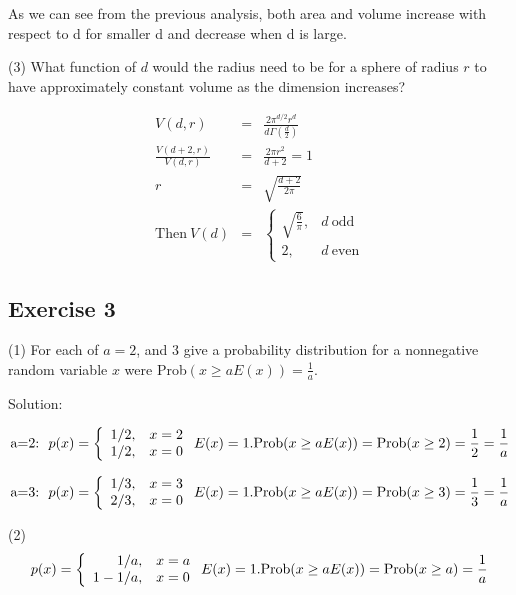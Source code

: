 \begin{sloppypar}
As we can see from the previous analysis, both area and volume increase with respect to d for smaller d and decrease when d is large.

(3) What function of $d$ would the radius need to be for a sphere of radius $r$ to have approximately constant volume as the dimension increases?\par
\begin{eqnarray*}
    V(d,r)&=&\frac{2\pi^{d/2}r^d}{d\Gamma(\frac{d}{2})}\\
    \frac{V(d+2,r)}{V(d,r)}&=&\frac{2\pi r^2}{d+2}=1\\
    r&=&\sqrt{\frac{d+2}{2\pi}}\\
    \text{Then}~ V(d)&=&\left\{
    \begin{array}{rl}
        \sqrt{\frac{6}{\pi}}, & d~\text{odd}\\
        2, & d~\text{even}
    \end{array}\right.  
\end{eqnarray*}

\subsection{Exercise 3}
(1)  For each of $a=2$, and 3 give a probability distribution for a nonnegative random variable $x$ were Prob$(x\geq aE(x))=\frac{1}{a}.$\par

Solution:\par
\begin{equation}
\text{a=2:}~~p(x)=\left\{
\begin{array}{rl}
1/2, & x=2\\
1/2, & x=0
\end{array}\right.\\
E(x)=1.\\
\text{Prob}(x\geq aE(x))=\text{Prob}(x\geq 2)=\frac{1}{2}=\frac{1}{a}
\end{equation} 


\begin{equation}
\text{a=3:}~~p(x)=\left\{
\begin{array}{rl}
1/3, & x=3\\
2/3, & x=0
\end{array}\right.
E(x)=1.\\
\text{Prob}(x\geq aE(x))=\text{Prob}(x\geq 3)=\frac{1}{3}=\frac{1}{a}
\end{equation} 

(2)
\begin{equation}
p(x)=\left\{
\begin{array}{rl}
1/a, & x=a\\
1-1/a, & x=0
\end{array}\right.
E(x)=1.\\
\text{Prob}(x\geq aE(x))=\text{Prob}(x\geq a)=\frac{1}{a}
\end{equation}


\end{sloppypar}
